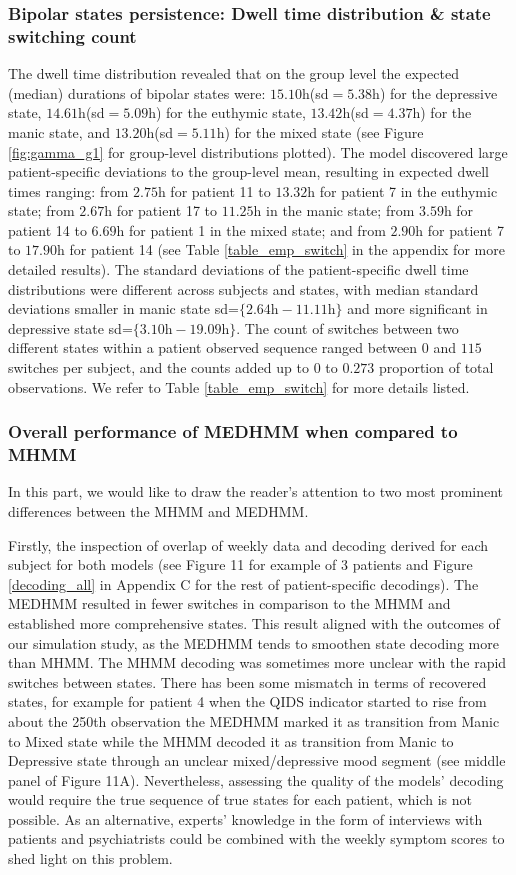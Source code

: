 \subsubsection*{Bipolar states persistence: Dwell time distribution \& state switching count}
The dwell time distribution revealed that on the group level the expected (median) durations of bipolar states were: $15.10$h(sd$=5.38$h) for the depressive state, $14.61$h(sd$=5.09$h) for the euthymic state, $13.42$h(sd$=4.37$h) for the manic state, and $13.20$h(sd$=5.11$h) for the mixed state (see Figure \ref{fig:gamma_g1} for group-level distributions plotted). The model discovered large patient-specific deviations to the group-level mean, resulting in expected dwell times ranging: from $2.75$h for patient 11 to $13.32$h for patient 7 in the euthymic state; from $2.67$h for patient 17 to $11.25$h in the manic state; from $3.59$h for patient 14 to $6.69$h for patient 1 in the mixed state; and from $2.90$h for patient 7 to $17.90$h for patient 14 (see Table \ref{table_emp_switch} in the appendix for more detailed results). The standard deviations of the patient-specific dwell time distributions were different across subjects and states, with median standard deviations smaller in manic state sd=$\{2.64\text{h}-11.11\text{h}\}$ and more significant in depressive state sd=$\{3.10\text{h}-19.09\text{h}\}$. The count of switches between two different states within a patient observed sequence ranged between $0$ and $115$ switches per subject, and the counts added up to $0$ to $0.273$ proportion of total observations. We refer to Table \ref{table_emp_switch} for more details listed. 

\subsubsection*{Overall performance of MEDHMM when compared to MHMM}
In this part, we would like to draw the reader's attention to two most prominent differences between the MHMM and MEDHMM. 

Firstly, the inspection of overlap of weekly data and decoding derived for each subject for both models (see Figure 11 for example of 3 patients and Figure \ref{decoding_all} in Appendix C for the rest of patient-specific decodings). The MEDHMM resulted in fewer switches in comparison to the MHMM and established more comprehensive states. This result aligned with the outcomes of our simulation study, as the MEDHMM tends to smoothen state decoding more than MHMM. The MHMM decoding was sometimes more unclear with the rapid switches between states. There has been some mismatch in terms of recovered states, for example for patient 4 when the QIDS indicator started to rise from about the 250th observation the MEDHMM marked it as transition from Manic to Mixed state while the MHMM decoded it as transition from Manic to Depressive state through an unclear mixed/depressive mood segment (see middle panel of Figure 11A). Nevertheless, assessing the quality of the models' decoding would require the true sequence of true states for each patient, which is not possible. As an alternative, experts' knowledge in the form of interviews with patients and psychiatrists could be combined with the weekly symptom scores to shed light on this problem. 

